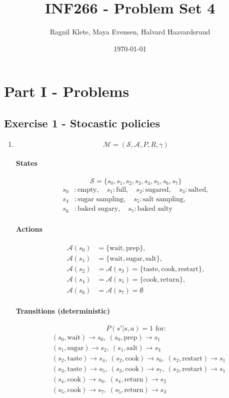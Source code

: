 \documentclass{article}
\title{INF266 - Problem Set 4}
\author{Ragnil Klete, Maya Evensen, Halvard Haavardsruud}
\date{\today}
\begin{document}
\maketitle

\section*{Part I - Problems}
\subsection*{Exercise 1 - Stocastic policies}
\begin{enumerate}
    \item 
\[
\mathcal{M} = (\mathcal{S}, \mathcal{A}, P, R, \gamma)
\]

\paragraph{States}
\[
\mathcal{S} = \{ s_0, s_1, s_2, s_3, s_4, s_5, s_6, s_7 \}
\]
\[
\begin{aligned}
s_0&:\text{empty},\quad
s_1:\text{full},\quad
s_2:\text{sugared},\quad
s_3:\text{salted},\\
s_4&:\text{sugar sampling},\quad
s_5:\text{salt sampling},\\
s_6&:\text{baked sugary},\quad
s_7:\text{baked salty}
\end{aligned}
\]

\paragraph{Actions}
\[
\begin{aligned}
\mathcal{A}(s_0)&=\{\text{wait}, \text{prep}\},\\
\mathcal{A}(s_1)&=\{\text{wait}, \text{sugar}, \text{salt}\},\\
\mathcal{A}(s_2)&=\mathcal{A}(s_3)=\{\text{taste}, \text{cook}, \text{restart}\},\\
\mathcal{A}(s_4)&=\mathcal{A}(s_5)=\{\text{cook}, \text{return}\},\\
\mathcal{A}(s_6)&=\mathcal{A}(s_7)=\emptyset
\end{aligned}
\]

\paragraph{Transitions (deterministic)}
\[
P(s'|s,a)=1 \text{ for:}
\]
\[
\begin{aligned}
&(s_0,\text{wait})\to s_0,\ (s_0,\text{prep})\to s_1\\
&(s_1,\text{sugar})\to s_2,\ (s_1,\text{salt})\to s_3\\
&(s_2,\text{taste})\to s_4,\ (s_2,\text{cook})\to s_6,\ (s_2,\text{restart})\to s_1\\
&(s_3,\text{taste})\to s_5,\ (s_3,\text{cook})\to s_7,\ (s_3,\text{restart})\to s_1\\
&(s_4,\text{cook})\to s_6,\ (s_4,\text{return})\to s_2\\
&(s_5,\text{cook})\to s_7,\ (s_5,\text{return})\to s_3
\end{aligned}
\]


\end{enumerate}
\end{document}
